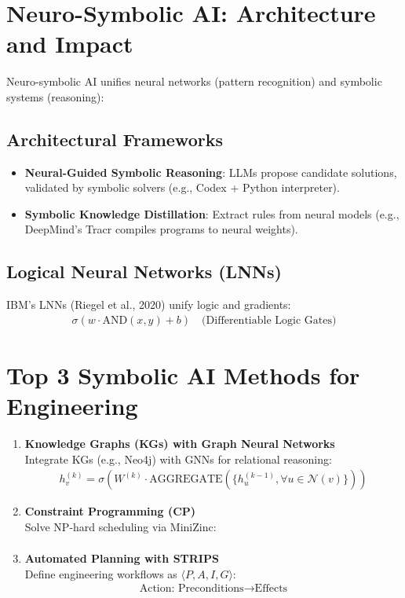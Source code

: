 \documentclass[12pt]{article}
\begin{document}
\section{Neuro-Symbolic AI: Architecture and Impact}
\label{sec:neurosym}
Neuro-symbolic AI unifies neural networks (pattern recognition) and symbolic systems (reasoning):

\subsection{Architectural Frameworks}
\begin{itemize}
\item \textbf{Neural-Guided Symbolic Reasoning}: LLMs propose candidate solutions, validated by symbolic solvers (e.g., Codex + Python interpreter).
\item \textbf{Symbolic Knowledge Distillation}: Extract rules from neural models (e.g., DeepMind’s Tracr compiles programs to neural weights).
\end{itemize}

\subsection{Logical Neural Networks (LNNs)}
IBM’s LNNs (Riegel et al., 2020) unify logic and gradients:
\begin{align}
\sigma(w \cdot \text{AND}(x, y) + b) \quad \text{(Differentiable Logic Gates)}
\end{align}

\section{Top 3 Symbolic AI Methods for Engineering}
\label{sec:top3}
\begin{enumerate}
\item \textbf{Knowledge Graphs (KGs) with Graph Neural Networks} \\
Integrate KGs (e.g., Neo4j) with GNNs for relational reasoning:
\begin{align}
h_v^{(k)} = \sigma\left(W^{(k)} \cdot \text{AGGREGATE}(\{h_u^{(k-1)}, \forall u \in \mathcal{N}(v)\})\right)
\end{align}

\item \textbf{Constraint Programming (CP)} \\
Solve NP-hard scheduling via MiniZinc:
\begin{align}
\end{align}

\item \textbf{Automated Planning with STRIPS} \\
Define engineering workflows as \( \langle P, A, I, G \rangle \):
\begin{align}
\text{Action: } \text{Preconditions} \rightarrow \text{Effects}
\end{align}
\end{enumerate}
\end{document}
